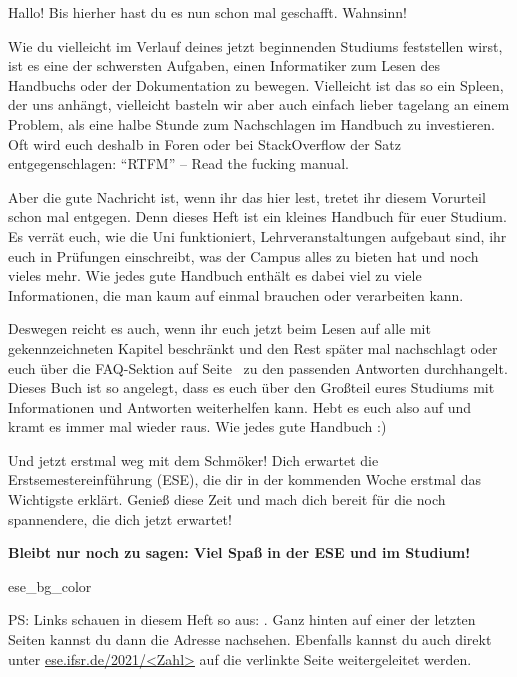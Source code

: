 

Hallo! Bis hierher hast du es nun schon mal geschafft. Wahnsinn!

Wie du vielleicht im Verlauf deines jetzt beginnenden Studiums feststellen wirst, ist es eine der schwersten Aufgaben, einen Informatiker zum Lesen des Handbuchs oder der Dokumentation zu bewegen. Vielleicht ist das so ein Spleen, der uns anhängt, vielleicht basteln wir aber auch einfach lieber tagelang an einem Problem, als eine halbe Stunde zum Nachschlagen im Handbuch zu investieren.
Oft wird euch deshalb in Foren oder bei StackOverflow der Satz entgegenschlagen: \enquote{RTFM} -- Read the fucking manual.

Aber die gute Nachricht ist, wenn ihr das hier lest, tretet ihr diesem Vorurteil schon mal entgegen. Denn dieses Heft ist ein kleines Handbuch für euer Studium.
Es verrät euch, wie die Uni funktioniert, Lehrveranstaltungen aufgebaut sind, ihr euch in Prüfungen einschreibt, was der Campus alles zu bieten hat und noch vieles mehr.
Wie jedes gute Handbuch enthält es dabei viel zu viele Informationen, die man kaum auf einmal brauchen oder verarbeiten kann.

Deswegen reicht es auch, wenn ihr euch jetzt beim Lesen auf alle mit  gekennzeichneten Kapitel beschränkt und den Rest später mal nachschlagt oder euch über die FAQ-Sektion auf Seite~\pageref{sec:faq} zu den passenden Antworten durchhangelt.
Dieses Buch ist so angelegt, dass es euch über den Großteil eures Studiums mit Informationen und Antworten weiterhelfen kann. Hebt es euch also auf und kramt es immer mal wieder raus. Wie jedes gute Handbuch :)

Und jetzt erstmal weg mit dem Schmöker! Dich erwartet die Erstsemestereinführung (ESE), die dir in der kommenden Woche erstmal das Wichtigste erklärt.
Genieß diese Zeit und mach dich bereit für die noch spannendere, die dich jetzt erwartet!

\textbf{Bleibt nur noch zu sagen: Viel Spaß in der ESE und im Studium!}


\begin{awesomeblock}{2pt}{\faLightbulb[regular]}{ese_bg_color}
    \begin{minipage}[t]{.82\textwidth}
\small PS\@: Links schauen in diesem Heft so aus: . Ganz hinten auf einer der letzten Seiten kannst du dann die Adresse nachsehen. Ebenfalls kannst du auch direkt unter \url{ese.ifsr.de/2021/<Zahl>} auf die verlinkte Seite weitergeleitet werden.
    \end{minipage}
\end{awesomeblock}
